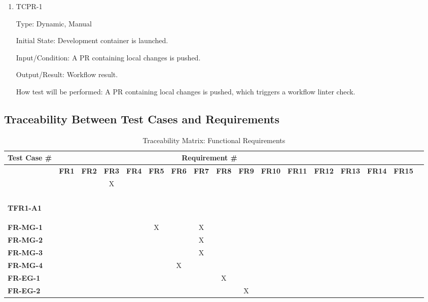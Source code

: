 \documentclass[12pt, titlepage]{article}
\begin{document}
\begin{enumerate}
\item{TCPR-1\\}\label{TCPR-1}

Type: Dynamic, Manual
					
Initial State: Development container is launched.
					
Input/Condition: A PR containing local changes is pushed.
					
Output/Result: Workflow result.
					
How test will be performed: A PR containing local changes is pushed, which triggers a workflow linter check.
\end{enumerate}
\clearpage %
\begin{landscape}
    \pagestyle{empty}%
\subsection{Traceability Between Test Cases and Requirements}

\begin{table}[H]
    \centering
    \begin{adjustbox}{width=1\textwidth}
    \begin{tabular}{l|cccccccccccccccc}
        \textbf{Test Case \#} & \multicolumn{13}{c}{\textbf{Requirement \#}}\\
        \hline
        ~ & \textbf{FR1} & \textbf{FR2} & \textbf{FR3} & \textbf{FR4} & \textbf{FR5} & \textbf{FR6} & \textbf{FR7} & \textbf{FR8} & \textbf{FR9} & \textbf{FR10} & \textbf{FR11} & \textbf{FR12} & \textbf{FR13}& \textbf{FR14}& \textbf{FR15}\\\
        
        \textbf{TFR1-A1}   & ~ & ~ & X & ~ & ~ & ~ & ~ & ~ & ~ & ~ & ~ & ~ & ~\\
        \textbf{FR-MG-1}    & ~ & ~ & ~ & ~ & X & ~ & X & ~ & ~ & ~ & ~ & ~ & ~\\
        \textbf{FR-MG-2}  & ~ & ~ & ~ & ~ & ~ & ~ & X & ~ & ~ & ~ & ~ & ~ & ~\\
        \textbf{FR-MG-3}  & ~ & ~ & ~ & ~ & ~ & ~ & X & ~ & ~ & ~ & ~ & ~ & ~\\
        \textbf{FR-MG-4}  & ~ & ~ & ~ & ~ & ~ & X & ~ & ~ & ~ & ~ & ~ & ~ & ~\\
        \textbf{FR-EG-1}  & ~ & ~ & ~ & ~ & ~ & ~ & ~ & X & ~ & ~ & ~ & ~ & ~\\
        \textbf{FR-EG-2}  & ~ & ~ & ~ & ~ & ~ & ~ & ~ & ~ & X & ~ & ~ & ~ & ~\\
    \end{tabular}
    \end{adjustbox}
    \caption{Traceability Matrix: Functional Requirements}
    \label{Traceability Matrix: Functional Requirements}
\end{table}


\end{landscape}
\end{document}
